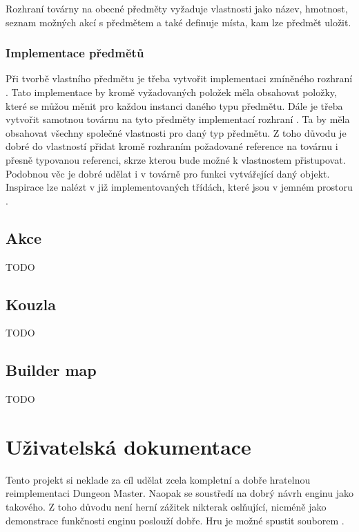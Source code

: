  Rozhraní továrny na obecné předměty vyžaduje vlastnosti jako název, hmotnost, seznam 
možných akcí s předmětem a také definuje místa, kam lze předmět uložit.

\subsection{Implementace předmětů}
Při tvorbě vlastního předmětu je třeba vytvořit implementaci zmíněného rozhraní . Tato implementace by 
kromě vyžadovaných položek měla obsahovat položky, které se můžou měnit pro každou instanci daného typu předmětu. 
Dále je třeba vytvořit samotnou továrnu na tyto předměty implementací rozhraní .
Ta by měla obsahovat všechny společné vlastnosti pro daný typ předmětu. Z toho  důvodu je dobré do vlastností 
přidat kromě rozhraním požadované reference na továrnu i přesně typovanou referenci, skrze kterou bude možné k 
vlastnostem přistupovat. Podobnou věc je dobré udělat i v továrně pro funkci vytvářející daný objekt. Inspirace
lze nalézt v již implementovaných třídách, které jsou v jemném prostoru .

\section{Akce}
TODO
\section{Kouzla}
TODO

\section{Builder map}
TODO

\chapter{Uživatelská dokumentace}
Tento projekt si neklade za cíl udělat zcela kompletní a dobře hratelnou reimplementaci Dungeon Master.
Naopak se soustředí na dobrý návrh enginu jako takového. Z toho důvodu není herní zážitek nikterak
oslňující, nicméně jako demonstrace funkčnosti enginu poslouží dobře. Hru je možné spustit souborem
.

